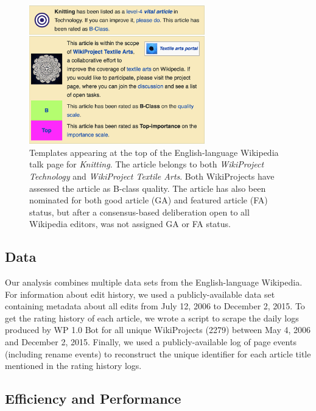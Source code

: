 \begin{figure}
\begin{center}
\includegraphics[width=3in]{fig-knitting.png}
\caption{
Templates appearing at the top of the English-language Wikipedia talk page
for {\em Knitting}.
The article belongs to both {\em WikiProject Technology} and
{\em WikiProject Textile Arts}.
Both WikiProjects have assessed the article as B-class quality.
The article has also been nominated for both good article (GA) and
featured article (FA) status,
but after a consensus-based deliberation open to all Wikipedia editors,
was not assigned GA or FA status.
\label{fig:knitting}
}
\end{center}
\end{figure}

\subsection{Data}

Our analysis combines multiple data sets from the English-language Wikipedia.
For information about edit history, we used a publicly-available data set containing
metadata about all edits from July 12, 2006 to December 2, 2015.
To get the rating history of each article,
we wrote a script to scrape the daily logs produced by WP 1.0 Bot for
all unique WikiProjects (2279)
between May 4, 2006 and December 2, 2015.
Finally, we used a publicly-available log of page events (including rename events)
to reconstruct the unique identifier for each article title mentioned in the rating history logs.

\subsection{Efficiency and Performance}

